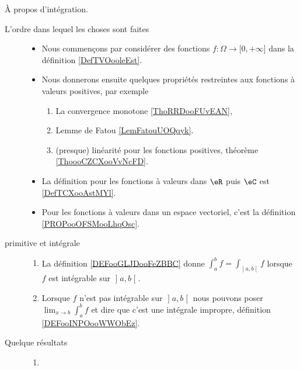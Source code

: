 

     \label{THEMEooHINHooJaSYQW}

À propos d'intégration.
\begin{description}

	\item[L'ordre dans lequel les choses sont faites]
	      \begin{itemize}
		      \item
		            Nous commençons par considérer des fonctions \( f\colon \Omega\to \mathopen[ 0 , +\infty \mathclose]\) dans la définition \ref{DefTVOooleEst}.
		      \item
		            Nous donnerons ensuite quelques propriétés restreintes aux fonctions à valeurs positives, par exemple
		            \begin{enumerate}
			            \item
			                  La convergence monotone \ref{ThoRRDooFUvEAN},
			            \item
			                  Lemme de Fatou \ref{LemFatouUOQqyk}.
			            \item
			                  (presque) linéarité pour les fonctions positives, théorème \ref{ThoooCZCXooVvNcFD}.
		            \end{enumerate}
		      \item
		            La définition pour les fonctions à valeurs dans \( \eR\) puis \( \eC\) est \ref{DefTCXooAstMYl}.
		      \item
		            Pour les fonctions à valeurs dans un espace vectoriel, c'est la définition \ref{PROPooOFSMooLhqOsc}.
	      \end{itemize}
      \item[primitive et intégrale]
          \begin{enumerate}
              \item
              La définition \ref{DEFooGLJDooFeZBBC} donne \( \int_a^bf=\int_{\mathopen] a ,b \mathclose[}f\) lorsque \( f\) est intégrable sur \( \mathopen] a , b \mathclose[\).
          \item Lorsque \( f\) n'est pas intégrable sur \( \mathopen] a , b \mathclose[\) nous pouvons poser \( \lim_{x\to b} \int_a^bf\) et dire que c'est une intégrale impropre, définition \ref{DEFooINPOooWWObEz}.
          \end{enumerate}
	\item[Quelque résultats]
	      \begin{enumerate}
		      \item

\end{enumerate}
\end{description}

